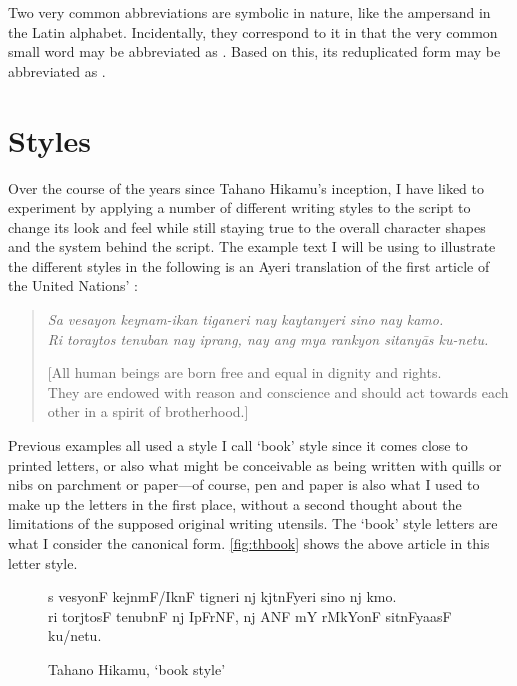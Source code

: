 Two very common abbreviations are symbolic in nature, like the ampersand
\orth{\&} in the Latin alphabet. Incidentally, they correspond to it in
that the very common small word  may be abbreviated as
\ayr{\&}. Based on this, its reduplicated form  may be abbreviated as \ayr{+}.


\section{Styles}

Over the course of the years since Tahano Hikamu's inception, I have liked to
experiment by applying a number of different writing styles to the script to
change its look and feel while still staying true to the overall character
shapes and the system behind the script. The example text I will be using to
illustrate the different styles in the following is an Ayeri translation of the
first article of the United Nations'
 \citep{benung:udhr}:

\blockcquote[Article 1]{udhr}{\textit{Sa vesayon keynam-ikan tiganeri nay
kaytanyeri sino nay kamo.\\
Ri toraytos tenuban nay iprang, nay ang mya rankyon sitanyās ku-netu.}

[All human beings are born free and equal in dignity and rights.\\
They are endowed with reason and conscience and should act towards each other 
in a spirit of brotherhood.]}

Previous examples all used a style I call `book' style since it comes close to
printed letters, or also what might be conceivable as being written with quills
or nibs on parchment or paper---of course, pen and paper is also what I used to
make up the letters in the first place, without a second thought about the
limitations of the supposed original writing utensils. The `book' style letters
are what I consider the canonical form. \autoref{fig:thbook} shows the above
article in this letter style.

\begin{figure}[ht]\centering
{\Tagati\Large s vesyonF kejnmF/IknF tigneri nj kjtnFyeri sino nj kmo.\\
ri torjtosF tenubnF nj IpFrNF, nj ANF mY rMkYonF sitnFyaasF 
ku/netu.}
\caption{Tahano Hikamu, `book style'}
\label{fig:thbook}
\end{figure}

